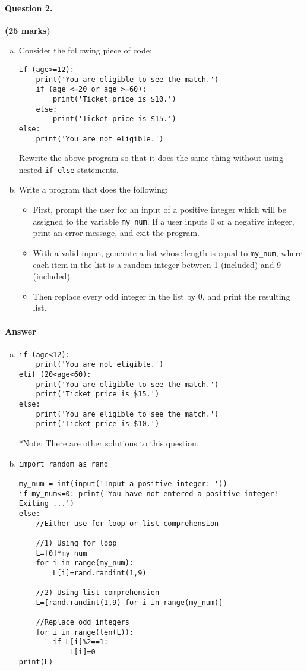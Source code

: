 \documentclass[12pt]{article}
\begin{document}
\paragraph{Question 2.} \hfill {\bf (25 marks)}
\begin{enumerate}[(a)]
\item Consider the following piece of code:
\begin{verbatim}
if (age>=12):
    print('You are eligible to see the match.')
    if (age <=20 or age >=60):
        print('Ticket price is $10.')
    else:
        print('Ticket price is $15.')
else:
    print('You are not eligible.')
\end{verbatim}
Rewrite the above program so that it does the same thing without using nested \verb|if-else| statements.
\item Write a program that does the following:
\begin{itemize}
\item First, prompt the user for an input of a positive integer which will be assigned to the variable \verb|my_num|. If a user inputs $0$ or a negative integer, print an error message, and exit the program.
\item With a valid input, generate a list whose length is equal to \verb|my_num|, where each item in the list is a random integer between 1 (included) and 9 (included).
\item Then replace every odd integer in the list by 0, and print the resulting list.
\end{itemize}
\end{enumerate}
\paragraph{Answer}
\begin{enumerate}[(a)]
\item \begin{verbatim}
if (age<12):
    print('You are not eligible.')
elif (20<age<60):
    print('You are eligible to see the match.')
    print('Ticket price is $15.')
else:
    print('You are eligible to see the match.')
    print('Ticket price is $10.')
\end{verbatim}
*Note: There are other solutions to this question.
\item \begin{verbatim}
import random as rand

my_num = int(input('Input a positive integer: '))
if my_num<=0: print('You have not entered a positive integer! Exiting ...')
else:
    //Either use for loop or list comprehension
	
    //1) Using for loop
    L=[0]*my_num
    for i in range(my_num):
        L[i]=rand.randint(1,9)
    
    //2) Using list comprehension
    L=[rand.randint(1,9) for i in range(my_num)]
    
    //Replace odd integers
    for i in range(len(L)):
        if L[i]%2==1:
            L[i]=0
print(L)
\end{verbatim}
\end{enumerate}
\end{document}
